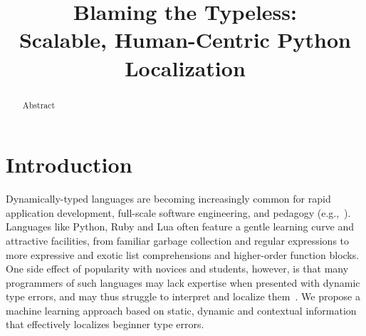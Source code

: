 \documentclass[conference]{IEEEtran}
\begin{document}
%
\title{Blaming the Typeless: \\ Scalable, Human-Centric Python Localization}

\iffalse

\author{\IEEEauthorblockN{Benjamin Cosman}
\IEEEauthorblockA{\textit{UC San Diego}\\
blcosman@eng.ecsd.edu}
\and
\IEEEauthorblockN{Leon Medvinsky}
\IEEEauthorblockA{\textit{UC San Diego}\\
lmedvinsky@eng.ecsd.edu}
\and
\IEEEauthorblockN{Ranjit Jhala}
\IEEEauthorblockA{\textit{UC San Diego}\\
jhala@cs.ecsd.edu}
\and
\IEEEauthorblockN{Westley Weimer}
\IEEEauthorblockA{\textit{University of Michigan}\\
weimerw@umich.edu}
}

\fi

\author{}

\maketitle

\begin{abstract}
Abstract
\end{abstract}

\section{Introduction}

Dynamically-typed languages are becoming increasingly common for rapid
application development, full-scale software engineering, and
pedagogy (e.g.,~\cite{FIXME,FIXME}). Languages like Python, Ruby and Lua
often feature a gentle learning curve and attractive facilities, from
familiar garbage collection and regular expressions to more expressive and
exotic list comprehensions and higher-order function blocks. One side
effect of popularity with novices and students, however, is that many
programmers of such languages may lack expertise when presented with
dynamic type errors, and may thus struggle to interpret and localize
them~\cite{FIXME,FIXME}. We propose a machine learning approach based on
static, dynamic and contextual information that effectively localizes
beginner type errors.
\end{document}
